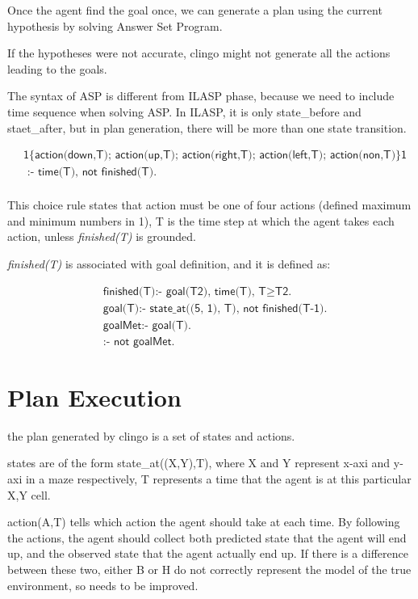 Once the agent find the goal once, we can generate a plan using the current hypothesis by solving Answer Set Program. 

If the hypotheses were not accurate, clingo might not generate all the actions leading to the goals. 

The syntax of ASP is different from ILASP phase, because we need to include time sequence when solving ASP.
In ILASP, it is only state\_before and staet\_after, but in plan generation, there will be more than one state transition. 

\begin{equation}
\begin{split}
&\textsf{1\{action(down,T); action(up,T); action(right,T); action(left,T); action(non,T)\}1} \\
&\textsf{ :- time(T), not finished(T).}\\
\end{split}
\end{equation}

This choice rule states that action must be one of four actions (defined maximum and minimum numbers in 1), 
T is the time step at which the agent takes each action, unless \textit{finished(T)} is grounded. 

\textit{finished(T)} is associated with goal definition, and it is defined as:

\begin{equation}
\begin{split}
&\textsf{finished(T):- goal(T2), time(T), T} \geq \textsf{T2.}\\
&\textsf{goal(T):- state\_at((5, 1), T), not finished(T-1).}\\
&\textsf{goalMet:- goal(T).}\\
&\textsf{:- not goalMet.}
\end{split}
\end{equation}

\section{Plan Execution}
\label{Plan execution}

the plan generated by clingo is a set of states and actions. 

states are of the form state\_at((X,Y),T), where X and Y represent x-axi and y-axi in a maze respectively, T represents a time that the agent is at 
this particular X,Y cell. 

action(A,T) tells which action the agent should take at each time. By following the actions, the agent should collect both predicted state that the 
agent will end up, and the observed state that the agent actually end up. If there is a difference between these two, either B or H do not correctly represent
the model of the true environment, so needs to be improved. 

